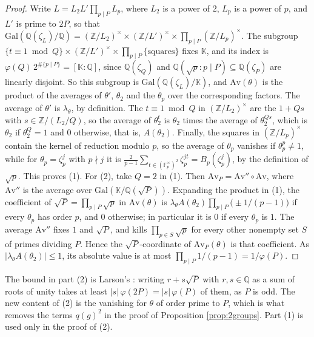 \documentclass[10pt]{article}
\theoremstyle{plain}
\theoremstyle{definition}
\theoremstyle{plain}
\begin{document}
\begin{proof}
Write $L=L_2L'\prod_{p\mid P}L_p$, where $L_2$ is a power of $2$, $L_p$ is a power of $p$, and $L'$ is prime to $2P$, so that $\mathrm{Gal}(\mathbb{Q}(\zeta_L)/\mathbb{Q})=(\mathbb{Z}/L_2)^\times\times(\mathbb{Z}/L')^\times\times\prod_{p\mid P}(\mathbb{Z}/L_p)^\times$. The subgroup $\{t\equiv1\bmod Q\}\times(\mathbb{Z}/L')^\times\times\prod_{p\mid P}\{\text{squares}\}$ fixes $\mathbb{K}$, and its index is $\varphi(Q)\,2^{\#\{p\mid P\}}=[\mathbb{K}:\mathbb{Q}]$, since $\mathbb{Q}(\zeta_Q)$ and $\mathbb{Q}(\sqrt p:p\mid P)\subseteq\mathbb{Q}(\zeta_P)$ are linearly disjoint. So this subgroup is $\mathrm{Gal}(\mathbb{Q}(\zeta_L)/\mathbb{K})$, and $\mathrm{Av}(\theta)$ is the product of the averages of $\theta'$, $\theta_2$ and the $\theta_p$ over the corresponding factors. The average of $\theta'$ is $\lambda_\theta$, by definition. The $t\equiv1\bmod Q$ in $(\mathbb{Z}/L_2)^\times$ are the $1+Qs$ with $s\in\mathbb{Z}/(L_2/Q)$, so the average of $\theta_2^t$ is $\theta_2$ times the average of $\theta_2^{Qs}$, which is $\theta_2$ if $\theta_2^Q=1$ and $0$ otherwise, that is, $A(\theta_2)$. Finally, the squares in $(\mathbb{Z}/L_p)^\times$ contain the kernel of reduction modulo $p$, so the average of $\theta_p$ vanishes if $\theta_p^p\neq1$, while for $\theta_p=\zeta_p^j$ with $p\nmid j$ it is $\frac{2}{p-1}\sum_{t\in(\mathbb{F}_p^\times)^2}\zeta_p^{jt}=B_p(\zeta_p^j)$, by the definition of $\sqrt p$. This proves (1). For (2), take $Q=2$ in (1). Then $\mathrm{Av}_P=\mathrm{Av}''\circ\mathrm{Av}$, where $\mathrm{Av}''$ is the average over $\mathrm{Gal}(\mathbb{K}/\mathbb{Q}(\sqrt P))$. Expanding the product in (1), the coefficient of $\sqrt P=\prod_{p\mid P}\sqrt p$ in $\mathrm{Av}(\theta)$ is $\lambda_\theta A(\theta_2)\prod_{p\mid P}\bigl(\pm1/(p-1)\bigr)$ if every $\theta_p$ has order $p$, and $0$ otherwise; in particular it is $0$ if every $\theta_p$ is $1$. The average $\mathrm{Av}''$ fixes $1$ and $\sqrt P$, and kills $\prod_{p\in S}\sqrt p$ for every other nonempty set $S$ of primes dividing $P$. Hence the $\sqrt P$-coordinate of $\mathrm{Av}_P(\theta)$ is that coefficient. As $|\lambda_\theta A(\theta_2)|\leq1$, its absolute value is at most $\prod_{p\mid P}1/(p-1)=1/\varphi(P)$.
\end{proof}

The bound in part (2) is Larson's \cite[Theorem 6.2]{MR3229513}: writing $r+s\sqrt P$ with $r,s\in\mathbb{Q}$ as a sum of roots of unity takes at least $|s|\,\varphi(2P)=|s|\,\varphi(P)$ of them, as $P$ is odd. The new content of (2) is the vanishing for $\theta$ of order prime to $P$, which is what removes the terms $q(g)^2$ in the proof of Proposition \ref{prop:2groups}. Part (1) is used only in the proof of (2).
\end{document}
